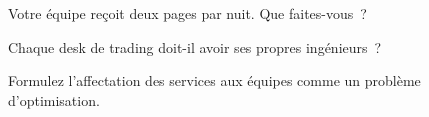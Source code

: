 \begin{interviewq}\label{iq:fm:engineering-organisation-design:4}
Votre équipe reçoit deux pages par nuit. Que faites-vous~?
\end{interviewq}

\begin{interviewq}\label{iq:fm:engineering-organisation-design:5}
Chaque desk de trading doit-il avoir ses propres ingénieurs~?
\end{interviewq}

\begin{interviewq}\label{iq:fm:engineering-organisation-design:6}
Formulez l'affectation des services aux équipes comme un problème d'optimisation.
\end{interviewq}

